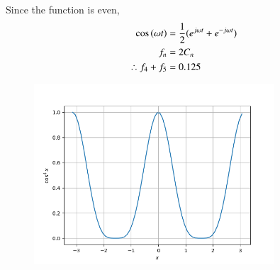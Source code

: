 \documentclass[journal,12pt,onecolumn]{IEEEtran}
\theoremstyle{remark}
\begin{document}
Since the function is even, 
\begin{align}
\cos\left(\omega t\right) &= \frac{1}{2}(e^{j\omega t}+e^{-j\omega t}) \\
f_n &= 2C_n \\
\therefore f_4 + f_5 &= 0.125
\end{align}
\begin{figure}[ht]
	\centering
	\includegraphics[width=0.8\textwidth]{2022/CE/30/figs/fig1.png}
\end{figure}
\end{document}
